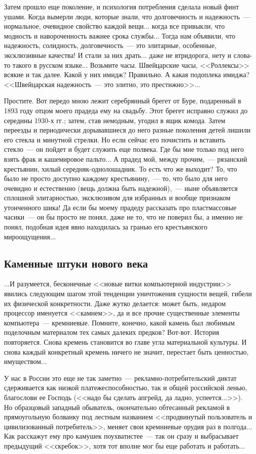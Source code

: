 \documentclass{scrbook}
\newcommand{\flqq}{<<}
\newcommand{\frqq}{>>}
\newcommand{\mdash}{~--- }
\newcommand{\commamdash}{~--- } %
\newcommand{\essaysection}[1]{\subsection*{#1}\nopagebreak}
\begin{document}
Затем прошло еще поколение, и психология потребления сделала новый финт ушами. Когда вымерли люди, которые знали, что долговечность и надежность{\mdash}нормальное, очевидное свойство каждой вещи... когда все привыкли, что модность и навороченность важнее срока службы... Тогда нам объявили, что надежность, солидность, долговечность{\mdash}это элитарные, особенные, эксклюзивные качества! И стали за них драть... даже не втридорога, нету и слова-то такого в русском языке... Возьмите часы. Швейцарские часы, {\flqq}Роллексы{\frqq} всякие и так далее. Какой у них имидж? Правильно. А какая подоплека имиджа? {\flqq}Швейцарская надежность{\mdash}это элитно, это престижно{\frqq}...

Простите. Вот передо мною лежит серебрянный брегет от Буре, подаренный в 1893 году отцом моего прадеда ему на свадьбу. Этот брегет исправно служил до середины 1930-х гг.; затем, став немодным, угодил в ящик комода. Затем переезды и периодически дорывавшиеся до него разные поколения детей лишили его стекла и минутной стрелки. Но если сейчас его почистить и вставить стекло{\mdash}он пойдет и будет служить еще полвека. Где бы мне только под него взять фрак и кашемировое пальто... А прадед мой, между прочим,{\commamdash}рязанский крестьянин, хилый середняк-однолошадник. То есть что же выходит? То, что было не просто доступно каждому крестьянину,{\commamdash}то, что было для него очевидно и естественно (вещь должна быть надежной),{\commamdash}ныне объявляется сплошной элитарностью, эксклюзивом для избранных и вообще признаком утонченного шика! Да если бы моему прадеду рассказать про пластмассовые часики{\mdash}он бы просто не понял, даже не то, что не поверил бы, а именно не понял, подобная идея явно находилась за гранью его крестьянского мироощущения...

\essaysection{Каменные штуки нового века}

...И разумеется, бесконечные {\flqq}новые витки компьютерной индустрии{\frqq} явились следующим шагом этой тенденции уничтожения сущности вещей, гибели их физической конкретности. Даже жутко делается: может быть, недаром процессор именуется {\flqq}камнем{\frqq}, да и все прочие существенные элементы компьютера{\mdash}кремниевые. Помните, конечно, какой камень был любимым поделочным материалом тех самых далеких предков? Вот-вот. История повторяется. Снова кремень становится во главе угла материальной культуры. И снова каждый конкретный кремень ничего не значит, перестает быть ценностью, имуществом...

У нас в России это еще не так заметно{\mdash}рекламно-потребительский диктат сдерживается как низкой платежеспособностью, так и общей российской ленью, благослови ее Господь ({\flqq}надо бы сделать апгрейд, да ладно, успеется...{\frqq}). Но образцовый западный обыватель, окончательно обтесанный рекламой в прямоугольную болванку под лестным названием {\flqq}продвинутый пользователь и цивилизованный потребитель{\frqq}, меняет свои кремниевые орудия раз в полгода... Как расскажут ему про камушек поухватистее{\mdash}так он сразу и выбрасывает предыдущий {\flqq}скребок{\frqq}, хотя тот вполне мог бы еще работать и работать...
\end{document}
